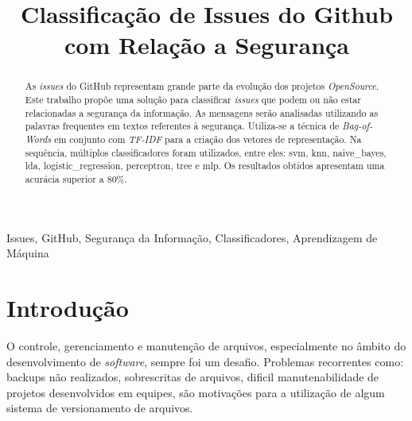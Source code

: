 \documentclass[conference]{IEEEtran}
\begin{document}
\title{Classificação de Issues do Github com Relação a Segurança}

\author{
    \and
}

\maketitle

\begin{abstract}
    As \textit{issues} do GitHub representam grande parte da evolução dos projetos \textit{OpenSource}. Este trabalho propõe uma solução para classificar \textit{issues} que podem ou não estar relacionadas a segurança da informação. As mensagens serão analisadas utilizando as palavras frequentes em textos referentes à segurança. Utiliza-se a técnica de \textit{Bag-of-Words} em conjunto com \textit{TF-IDF} para a criação dos vetores de representação. Na sequência, múltiplos classificadores foram utilizados, entre eles: svm, knn, naive\_bayes, lda, logistic\_regression, perceptron, tree e mlp. Os resultados obtidos apresentam uma acurácia superior a 80\%.
\end{abstract}

\begin{IEEEkeywords}
    Issues, GitHub, Segurança da Informação, Classificadores, Aprendizagem de Máquina
\end{IEEEkeywords}

\section{Introdução}

O controle, gerenciamento e manutenção de arquivos, especialmente no âmbito do desenvolvimento de \textit{software}, sempre foi um desafio. Problemas recorrentes como: backups não realizados, sobrescritas de arquivos, dificil manutenabilidade de projetos desenvolvidos em equipes, são motivações para a utilização de algum sistema de versionamento de arquivos. \cite{Scott:ProGit}
\end{document}
